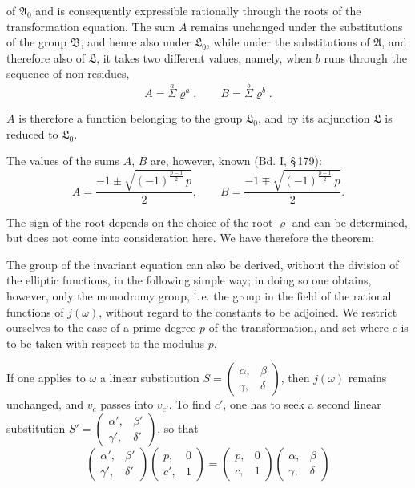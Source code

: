 of $\mathfrak{A}_0$ and is consequently expressible rationally through
the roots of the transformation equation. The sum $A$ remains
unchanged under the substitutions of the group $\mathfrak{B}$, and hence
also under $\mathfrak{L}_0$, while under the substitutions of $\mathfrak{A}$, and
therefore also of $\mathfrak{L}$, it takes two different values, namely,
when $b$ runs through the sequence of non-residues,
\[
A = \overset{a}{\Sigma}\varrho^a, \qquad B = \overset{b}{\Sigma}\varrho^b.
\]

$A$ is therefore a function belonging to the group $\mathfrak{L}_0$, and
by its adjunction $\mathfrak{L}$ is reduced to $\mathfrak{L}_0$.

The values of the sums $A$, $B$ are, however, known (Bd. I, \S\,179):
\[
A = \frac{-1 \pm \sqrt{(-1)^{\frac{p-1}{2}}\,p}}{2}, \qquad
B = \frac{-1 \mp \sqrt{(-1)^{\frac{p-1}{2}}\,p}}{2}.
\]

The sign of the root depends on the choice of the root $\varrho$
and can be determined, but does not come into consideration here.
We have therefore the theorem:


The group of the invariant equation can also be derived, without
the division of the elliptic functions, in the following simple
way; in doing so one obtains, however, only the monodromy
group, i.\,e. the group in the field of the rational
functions of $j(\omega)$, without regard to the constants to be
adjoined. We restrict ourselves to the case of a prime degree
$p$ of the transformation, and set
where $c$ is to be taken with respect to the modulus $p$.

If one applies to $\omega$ a linear substitution $S = \begin{pmatrix}\alpha, & \beta \\ \gamma, & \delta\end{pmatrix}$,
then $j(\omega)$ remains unchanged, and $v_c$ passes into $v_{c'}$. To
find $c'$, one has to seek a second linear substitution
$S' = \begin{pmatrix}\alpha', & \beta' \\ \gamma', & \delta'\end{pmatrix}$, so that
\[
\begin{pmatrix}\alpha', & \beta' \\ \gamma', & \delta'\end{pmatrix}
\begin{pmatrix}p, & 0 \\ c', & 1\end{pmatrix}
=
\begin{pmatrix}p, & 0 \\ c, & 1\end{pmatrix}
\begin{pmatrix}\alpha, & \beta \\ \gamma, & \delta\end{pmatrix}
\]
